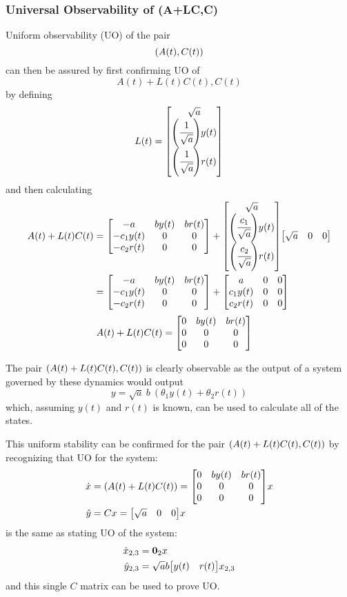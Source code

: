 \documentclass[letter]{article}
\begin{document}
\subsubsection{Universal Observability of (A+LC,C)}
Uniform observability (UO) of the pair $$\qty(A(t), C(t))$$ can then be assured by first confirming UO of $$A(t) + L(t) C(t), C(t)$$ by defining
\begin{equation}
	L(t) = \mqty[\sqrt{a}\\
				 \qty(\cfrac{1}{\sqrt{a}})y(t)\\
				 \qty(\cfrac{1}{\sqrt{a}})r(t)]
\end{equation}
and then calculating
\begin{align}
	A(t) + L(t) C(t)
	&= \mqty[-a & b y(t) & b r(t)\\
			-c_1 y(t) & 0 &0\\
			-c_2 r(t) & 0 &0]
	+ \mqty[\sqrt{a}\\
			\qty(\cfrac{c_1}{\sqrt{a}})y(t)\\
			\qty(\cfrac{c_2}{\sqrt{a}})r(t)]
	  \mqty[\sqrt{a} & 0 & 0]\\
	&= \mqty[-a & b y(t) & b r(t)\\
			-c_1 y(t) & 0 &0\\
			-c_2 r(t) & 0 &0]
	+  \mqty[a & 0 & 0\\
			c_1 y(t) & 0 &0\\
			c_2 r(t) & 0 &0]
\end{align}
\begin{align}
	A(t) + L(t) C(t)
	&= \mqty[0 & b y(t) & b r(t)\\
			0 & 0 &0\\
			0 & 0 &0]
\end{align}

The pair $\qty(A(t) + L(t) C(t), C(t))$ is clearly observable as the output of a system governed by these dynamics would output
\begin{equation}
	y = \sqrt{a} \ b \ (\theta_1 y(t) + \theta_2 r(t))
\end{equation}
which, assuming $y(t)$ and $r(t)$ is known, can be used to calculate all of the states.

This uniform stability can be confirmed for the pair $\qty(A(t) + L(t) C(t), C(t))$ by recognizing that UO for the system:
\begin{equation}
	\begin{aligned}
		\dot{x}
		&= (A(t) + L(t) C(t))
		= \mqty[0 & b y(t) & b r(t)\\
				0 & 0 &0\\
				0 & 0 &0] x\\
		\hat{y}
		&= C x = \mqty[\sqrt{a} & 0 & 0] x
	\end{aligned}
\end{equation}
is the same as stating UO of the system:
\begin{equation}
	\begin{aligned}
		\dot{x}_{2,3}
		&= \vb{0}_2 x\\
		\hat{y}_{2,3}
		&= \sqrt{a} b \mqty[y(t) & r(t)] x_{2,3}
	\end{aligned}
\end{equation}
and this single $C$ matrix can be used to prove UO.\\
\end{document}
